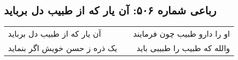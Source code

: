 \begin{center}
\section*{رباعی شماره ۵۰۶: آن یار که از طبیب دل برباید}
\label{sec:0506}
\begin{longtable}{l p{0.5cm} r}
آن یار که از طبیب دل برباید
&&
او را دارو طبیب چون فرمایند
\\
یک ذره ز حسن خویش اگر بنماید
&&
والله که طبیب را طبیبی باید
\\
\end{longtable}
\end{center}
